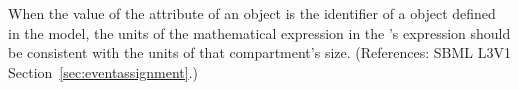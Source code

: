 When the value of the attribute  of an \EventAssignment
object is the identifier of a \Compartment object defined in the model, the
units of the mathematical expression in the \EventAssignment's 
expression should be consistent with the units of that compartment's size.
(References: SBML L3V1 Section~\ref{sec:eventassignment}.)
